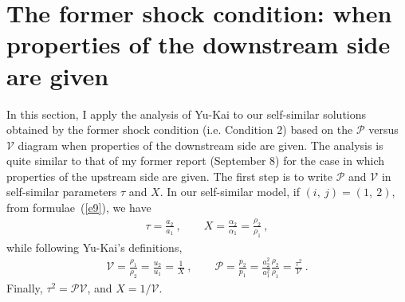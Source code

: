 \documentclass[fleqn,usenatbib]{mnras}
\begin{document}



\section{The former shock condition: when properties of the downstream side are given}
\label{s2}
In this section, I apply the analysis of Yu-Kai to our self-similar solutions obtained by the former shock condition (i.e. Condition 2) based on the $\mathcal{P}$ versus $\mathcal{V}$ diagram when properties of the downstream side are given. The analysis is quite similar to that of my former report (September 8) for the case in which properties of the upstream side are given. The first step is to write $\mathcal{P}$ and $\mathcal{V}$ in self-similar parameters $\tau$ and $X$. In our self-similar model, if $(i,\ j)=(1,\ 2)$, from formulae~(\ref{e9}), we have 
\begin{gather}
\tau=\frac{a_{2}}{a_{1}}\ ,\qquad X=\frac{\alpha_{2}}{\alpha_{1}}=\frac{\rho_{2}}{\rho_{1}}\ ,\label{e41}
\end{gather}
while following Yu-Kai's definitions,
\begin{align}
\mathcal{V}=\frac{\rho_{1}}{\rho_{2}}=\frac{u_{2}}{u_{1}}=\frac{1}{X}\ ,\qquad\mathcal{P}=\frac{p_{2}}{p_{1}}=\frac{a_{2}^{2}}{a_{1}^{2}}\frac{\rho_{2}}{\rho_{1}}=\frac{\tau^{2}}{\mathcal{V}}\ .\label{e42}
\end{align}
Finally, $\tau^{2}=\mathcal{PV}$, and $X=1/\mathcal{V}$.
\end{document}
